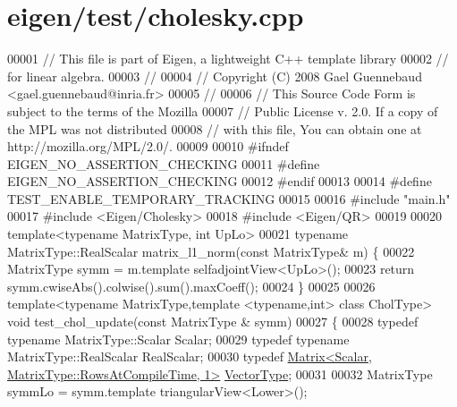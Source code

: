 \hypertarget{eigen_2test_2cholesky_8cpp_source}{}\section{eigen/test/cholesky.cpp}
\label{eigen_2test_2cholesky_8cpp_source}

\begin{DoxyCode}
00001 \textcolor{comment}{// This file is part of Eigen, a lightweight C++ template library}
00002 \textcolor{comment}{// for linear algebra.}
00003 \textcolor{comment}{//}
00004 \textcolor{comment}{// Copyright (C) 2008 Gael Guennebaud <gael.guennebaud@inria.fr>}
00005 \textcolor{comment}{//}
00006 \textcolor{comment}{// This Source Code Form is subject to the terms of the Mozilla}
00007 \textcolor{comment}{// Public License v. 2.0. If a copy of the MPL was not distributed}
00008 \textcolor{comment}{// with this file, You can obtain one at http://mozilla.org/MPL/2.0/.}
00009 
00010 \textcolor{preprocessor}{#ifndef EIGEN\_NO\_ASSERTION\_CHECKING}
00011 \textcolor{preprocessor}{#define EIGEN\_NO\_ASSERTION\_CHECKING}
00012 \textcolor{preprocessor}{#endif}
00013 
00014 \textcolor{preprocessor}{#define TEST\_ENABLE\_TEMPORARY\_TRACKING}
00015 
00016 \textcolor{preprocessor}{#include "main.h"}
00017 \textcolor{preprocessor}{#include <Eigen/Cholesky>}
00018 \textcolor{preprocessor}{#include <Eigen/QR>}
00019 
00020 \textcolor{keyword}{template}<\textcolor{keyword}{typename} MatrixType, \textcolor{keywordtype}{int} UpLo>
00021 \textcolor{keyword}{typename} MatrixType::RealScalar matrix\_l1\_norm(\textcolor{keyword}{const} MatrixType& m) \{
00022   MatrixType symm = m.template selfadjointView<UpLo>();
00023   \textcolor{keywordflow}{return} symm.cwiseAbs().colwise().sum().maxCoeff();
00024 \}
00025 
00026 \textcolor{keyword}{template}<\textcolor{keyword}{typename} MatrixType,\textcolor{keyword}{template} <\textcolor{keyword}{typename},\textcolor{keywordtype}{int}> \textcolor{keyword}{class }CholType> \textcolor{keywordtype}{void} test\_chol\_update(\textcolor{keyword}{const} MatrixType
      & symm)
00027 \{
00028   \textcolor{keyword}{typedef} \textcolor{keyword}{typename} MatrixType::Scalar Scalar;
00029   \textcolor{keyword}{typedef} \textcolor{keyword}{typename} MatrixType::RealScalar RealScalar;
00030   \textcolor{keyword}{typedef} \hyperlink{group___core___module_class_eigen_1_1_matrix}{Matrix<Scalar, MatrixType::RowsAtCompileTime, 1>} 
      \hyperlink{struct_vector_type}{VectorType};
00031 
00032   MatrixType symmLo = symm.template triangularView<Lower>();

\end{DoxyCode}
